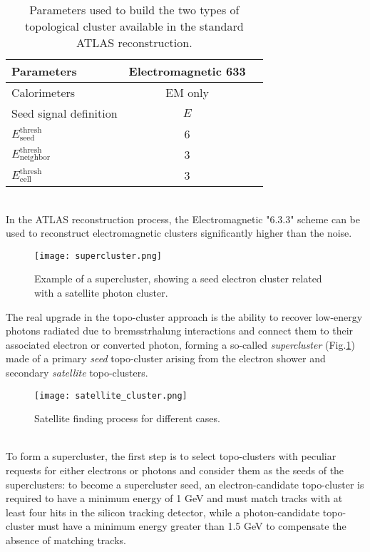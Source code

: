 \begin{table}[h]
\caption{Parameters used to build the two types of topological cluster available in the standard ATLAS reconstruction.}
\begin{center}
\begin{tabular}{ l | c c }
  Parameters & Electromagnetic 633 \\
  \hline			
  Calorimeters & EM only \\
  Seed signal definition & $E$ \\
  $E_{\text{seed}}^{\text{thresh}}$ & 6 \\
  $E_{\text{neighbor}}^{\text{thresh}}$ & 3 \\
  $E_{\text{cell}}^{\text{thresh}}$ & 3
\end{tabular}
\end{center}
\end{table}
\\In the ATLAS reconstruction process, the Electromagnetic "6.3.3" scheme can be used to reconstruct electromagnetic clusters significantly higher than the noise. 
\begin{figure}[htb]
\centering
\texttt{[image: supercluster.png]}
\caption{Example of a supercluster, showing a seed electron cluster related with a satellite photon cluster.}
\label{supercluster}
\end{figure}
The real upgrade in the topo-cluster approach is the ability to recover low-energy photons radiated due to bremsstrhalung interactions and connect them to their associated electron or converted photon, forming a so-called \emph{supercluster} (Fig.\ref{supercluster}) \cite{ATL-PHYS-PUB-2017-022} made of a primary \emph{seed} topo-cluster arising from the electron shower and secondary \emph{satellite} topo-clusters.
\begin{figure}[b!]
\centering
\texttt{[image: satellite\_cluster.png]}
\caption{Satellite finding process for different cases.}
\label{satellite}
\end{figure}
\\To form a supercluster, the first step is to select topo-clusters with peculiar requests for either electrons or photons and consider them as the seeds of the superclusters: to become a supercluster seed, an electron-candidate topo-cluster is required to have a minimum energy of 1 GeV and must match tracks with at least four hits in the silicon tracking detector, while a photon-candidate topo-cluster must have a minimum energy greater than 1.5 GeV to compensate the absence of matching tracks.
